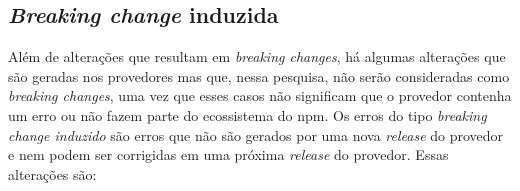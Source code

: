 \subsection{\textit{Breaking change} induzida}
\label{subsec:break_without}
Além de alterações que resultam em \textit{breaking changes}, há algumas alterações que são geradas nos provedores mas que, nessa pesquisa, não serão consideradas como \textit{breaking changes}, uma vez que esses casos não significam que o provedor contenha um erro ou não fazem parte do ecossistema do \textsf{npm}. Os erros do tipo \textit{breaking change induzido} são erros que não são gerados por uma nova \textit{release} do provedor e nem podem ser corrigidas em uma próxima \textit{release} do provedor. Essas alterações são:

